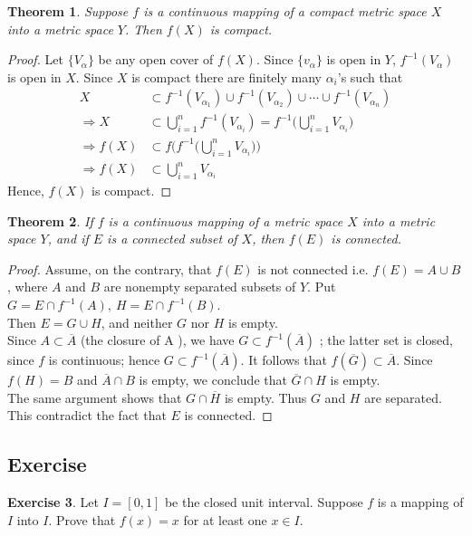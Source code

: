 \documentclass[	DIV=calc,paper=a4,fontsize=11pt]{scrartcl}	 	%
\newtheorem{thm}{Theorem}[section]
\theoremstyle{definition}
\newtheorem{exer}[thm]{Exercise}
\theoremstyle{plain}
\theoremstyle{remark}
\begin{document}
\begin{thm}
Suppose $f$ is a continuous mapping of a compact metric space $X$ into a metric space $Y$. Then $f(X)$ is compact.
\end{thm}

\begin{proof}
Let $\{V_{\alpha}\}$ be any open cover of $f(X)$. Since $\{v_{\alpha}\}$ is open in $Y$, $f^{-1}(V_{\alpha})$ is open in $X$. Since $X$ is compact there are finitely many $\alpha_i$'s such that
\begin{align*}
X&\subset f^{-1}(V_{\alpha_1})\cup f^{-1}(V_{\alpha_2})\cup\cdots \cup f^{-1}(V_{\alpha_n})\\
\Rightarrow X &\subset \bigcup_{i=1}^{n}f^{-1}(V_{\alpha_i})=f^{-1}\biggl(\bigcup_{i=1}^{n}V_{\alpha_i}\biggl)\\
\Rightarrow f(X)&\subset f\biggl(f^{-1}\biggl(\bigcup_{i=1}^{n}V_{\alpha_i}\biggl)\biggl)\\
\Rightarrow f(X)&\subset \bigcup_{i=1}^{n}V_{\alpha_i}
\end{align*}
Hence, $f(X)$ is compact.
\end{proof}

\begin{thm}
If $f$ is a continuous mapping of a metric space $X$ into a metric space $Y$, and if $E$ is a connected subset of $X$, then $f(E)$ is connected.
\end{thm}

\begin{proof}
Assume, on the contrary, that $f(E)$ is not connected i.e. $f(E) = A \cup B$, where $A$ and $B$ are nonempty separated subsets of $Y$. Put $G = E \cap f^{-1}(A),\ H = E \cap f^{-1}(B)$.\\
Then $E = G \cup H$, and neither $G$ nor $H$ is empty.\\
Since $A \subset \overline{A}$ (the closure of A ), we have $G\subset f^{-1}(\overline{A})$ ; the latter set is closed, since $f$ is continuous; hence $G \subset f^{-1}(\overline{A})$. It follows that $f(\overline{G})\subset \overline{A}$.
Since $f(H) = B$ and $\overline{A}\cap B$ is empty, we conclude that $\overline{G}\cap H$ is empty.\\
The same argument shows that $G \cap \overline{H}$ is empty. Thus $G$ and $H$ are separated. This contradict the fact that $E$ is connected.
\end{proof}

\newpage
\subsection{Exercise}
\begin{exer}\label{051}
Let $I=[0,1]$ be the closed unit interval. Suppose $f$ is a mapping of $I$ into $I$. Prove that $f(x)=x$ for at least one $x\in I$.
\end{exer}
\end{document}
